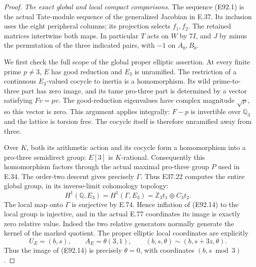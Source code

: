 \begin{proof}
\emph{The exact global and local compact comparisons.}
The sequence (E92.1) is the actual Tate-module
sequence of the generalized Jacobian in E.37.
Its inclusion uses the eight peripheral columns;
its projection selects $f_1,f_2$. The retained
matrices intertwine both maps. In particular
$T$ acts on $W$ by $7I$, and $J$ by minus the
permutation of the three indicated pairs, with
$-1$ on $A_0,B_0$.

We first check the full scope of the global
proper elliptic assertion. At every finite
prime $p\ne3$, $E$ has good reduction and
$E_3$ is unramified. The restriction of a
continuous $E_3$-valued cocycle to inertia
is a homomorphism. Its wild prime-to-three
part has zero image, and its tame pro-three
part is determined by a vector satisfying
$Fv=pv$. The good-reduction eigenvalues have
complex magnitude $\sqrt p$, so this vector
is zero. This argument applies integrally:
$F-p$ is invertible over $\mathbb Q_3$ and
the lattice is torsion free. The cocycle
itself is therefore unramified away from three.

Over $K$, both its arithmetic action and its
cocycle form a homomorphism into a pro-three
semidirect group: $E[3]$ is $K$-rational.
Consequently this homomorphism factors through
the actual maximal pro-three group $P$ used
in E.34. The order-two descent gives precisely
$\Gamma$. Thus E37.22 computes the entire
global group, in its inverse-limit cohomology
topology:
\[
 H^1(\mathbb Q,E_3)=H^1(\Gamma,E_3)
      =\mathbb Z_3t_1\oplus C_3t_2.
 \tag{E92.14}
\]
The local map onto $\Gamma$ is surjective
by E.74. Hence inflation of (E92.14) to the
local group is injective, and in the actual
E.77 coordinates its image is exactly zero
relative value. Indeed the two relative
generators normally generate the kernel
of the marked quotient. The proper elliptic
local coordinates are explicitly
\[
     U_E=(b,s),\qquad A_E=\theta(3,1),\qquad
     (b,s,\theta)\sim(b,s+3z,\theta).
 \tag{E92.15}
\]
Thus the image of (E92.14) is precisely
$\theta=0$, with coordinates $(b,s\bmod3)$.


\end{proof}
